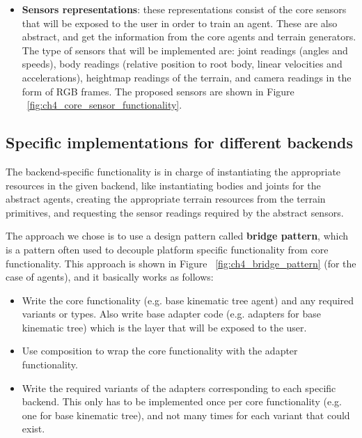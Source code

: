 \begin{itemize}
        \figFrameworkCoreTerrain

    \item \textbf{Sensors representations}: these representations consist of the core sensors that will be exposed
          to the user in order to train an agent. These are also abstract, and get the information from the
          core agents and terrain generators. The type of sensors that will be implemented are: joint readings (angles 
          and speeds), body readings (relative position to root body, linear velocities and accelerations), 
          heightmap readings of the terrain, and camera readings in the form of RGB frames. The proposed sensors are shown
          in Figure ~\ref{fig:ch4_core_sensor_functionality}.

        \figFrameworkCoreSensor
\end{itemize}

\subsection{Specific implementations for different backends}


The backend-specific functionality is in charge of instantiating the appropriate 
resources in the given backend, like instantiating bodies and joints for the abstract 
agents, creating the appropriate terrain resources from the terrain primitives, and requesting
the sensor readings required by the abstract sensors.

The approach we chose is to use a design pattern called \textbf{bridge pattern}, which
is a pattern often used to decouple platform specific functionality from core functionality.
This approach is shown in Figure ~\ref{fig:ch4_bridge_pattern} (for the case of agents), 
and it basically works as follows:

\begin{itemize}
    \item Write the core functionality (e.g. base kinematic tree agent) and any
          required variants or types. Also write base adapter code (e.g. adapters for base kinematic tree)
          which is the layer that will be exposed to the user.
    \item Use composition to wrap the core functionality with the adapter functionality.
    \item Write the required variants of the adapters corresponding to each specific backend.
          This only has to be implemented once per core functionality (e.g. one for base kinematic tree),
          and not many times for each variant that could exist.
\end{itemize}


